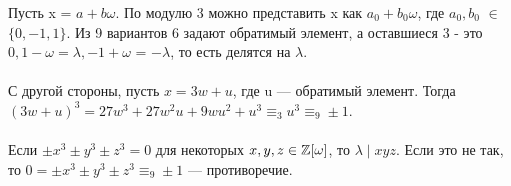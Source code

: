 \Proof
Пусть x = $a+b\omega$. По модулю 3 можно представить x как $a_0+b_0\omega$, где $a_0, b_0$ $\in$ $\{0, −1, 1\}$. Из 9 вариантов 6 задают
обратимый элемент, а оставшиеся 3 - это $0, 1 -\omega = \lambda, -1 + \omega$ =
$-\lambda$, то есть делятся на $\lambda$. 
\\
\\
С другой стороны, пусть $x = 3w + u$, где u — обратимый элемент. Тогда
$(3w + u)^3 = 27w^3 + 27w^2u + 9wu^2 + u^3  \equiv_3 u^3  \equiv_9 \pm1$.
\EndProof
\\
\\
\Lemma
	Если $\pm x^3 \pm y^3 \pm z^3 = 0$ для некоторых $x, y, z \in \mathbb{Z}[\omega]$, то $\lambda \mid xyz$.
\Proof
	Если это не так, то $0 = \pm x^3 \pm y^3 \pm z^3 \equiv_9 \pm 1$ --- противоречие.
\EndProof
